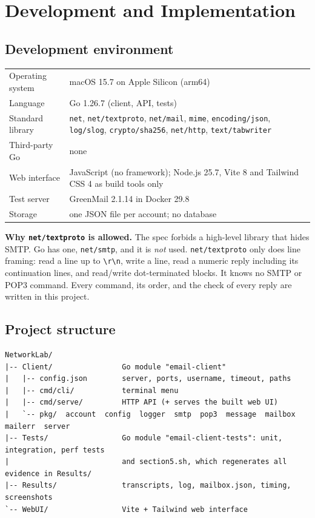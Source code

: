\documentclass[11pt,a4paper]{article}
\begin{document}
\section{Development and Implementation}

\subsection{Development environment}

\begin{table}[H]
\centering\small
\begin{tabularx}{\linewidth}{@{} l X @{}}
\toprule
Operating system & macOS 15.7 on Apple Silicon (arm64) \\
Language         & Go 1.26.7 (client, API, tests) \\
Standard library & \texttt{net}, \texttt{net/textproto}, \texttt{net/mail}, \texttt{mime},
                   \texttt{encoding/json}, \texttt{log/slog}, \texttt{crypto/sha256},
                   \texttt{net/http}, \texttt{text/tabwriter} \\
Third-party Go   & none \\
Web interface    & JavaScript (no framework); Node.js 25.7, Vite 8 and Tailwind CSS 4 as build tools only \\
Test server      & GreenMail 2.1.14 in Docker 29.8 \\
Storage          & one JSON file per account; no database \\
\bottomrule
\end{tabularx}
\end{table}

\textbf{Why \texttt{net/textproto} is allowed.} The spec forbids a high-level library that
hides SMTP. Go has one, \texttt{net/smtp}, and it is \emph{not} used. \texttt{net/textproto}
only does line framing: read a line up to \verb|\r\n|, write a line, read a numeric reply
including its continuation lines, and read/write dot-terminated blocks. It knows no SMTP or
POP3 command. Every command, its order, and the check of every reply are written in this
project.

\subsection{Project structure}

\begin{lstlisting}[style=wire]
NetworkLab/
|-- Client/                Go module "email-client"
|   |-- config.json        server, ports, username, timeout, paths
|   |-- cmd/cli/           terminal menu
|   |-- cmd/serve/         HTTP API (+ serves the built web UI)
|   `-- pkg/  account  config  logger  smtp  pop3  message  mailbox  mailerr  server
|-- Tests/                 Go module "email-client-tests": unit, integration, perf tests
|                          and section5.sh, which regenerates all evidence in Results/
|-- Results/               transcripts, log, mailbox.json, timing, screenshots
`-- WebUI/                 Vite + Tailwind web interface
\end{lstlisting}
\end{document}
